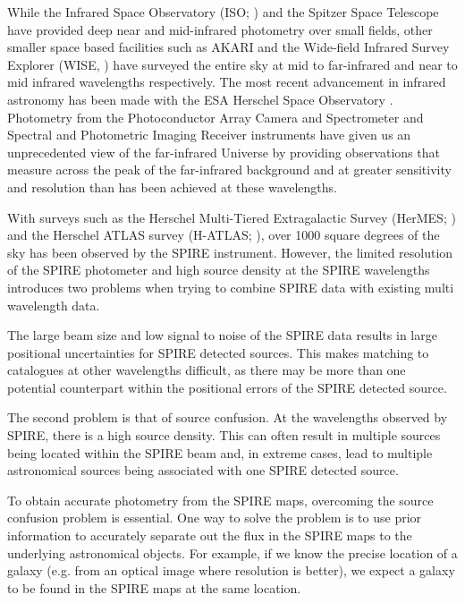 \documentclass[useAMS,usenatbib]{mnras}
\begin{document}
While the Infrared Space Observatory (ISO; \cite{Kessler:1996}) and the Spitzer Space Telescope \citep{Werner:2004} have provided deep near and mid-infrared photometry over small fields, other smaller space based facilities such as AKARI \citep{Murakami:2007} and the Wide-field Infrared Survey Explorer (WISE, \cite{Wright:2010}) have surveyed the entire sky at mid to far-infrared and near to mid infrared wavelengths respectively. The most recent advancement in infrared astronomy has been made with the ESA Herschel Space Observatory \citep{Pilbratt:2010}. Photometry from the Photoconductor Array Camera and Spectrometer \citep[PACS][]{Poglitsch:2010} and Spectral and Photometric Imaging Receiver \citep[SPIRE][]{Griffin:2010} instruments have given us an unprecedented view of the far-infrared Universe by providing observations that measure across the peak of the far-infrared background and at greater sensitivity and resolution than has been achieved at these wavelengths.

With surveys such as the Herschel Multi-Tiered Extragalactic Survey (HerMES; \cite{Oliver:2012}) and the Herschel ATLAS survey (H-ATLAS; \cite{Eales:2010}), over 1000 square degrees of the sky has been observed by the SPIRE instrument. However, the limited resolution of the SPIRE photometer and high source density at the SPIRE wavelengths introduces two problems when trying to combine SPIRE data with existing multi wavelength data. 

The large beam size and low signal to noise of the SPIRE data results in large positional uncertainties for SPIRE detected sources. This makes matching to catalogues at other wavelengths difficult, as there may be more than one potential counterpart within the positional errors of the SPIRE detected source.

The second problem is that of source confusion. At the wavelengths observed by SPIRE, there is a high source density. This can often result in multiple sources being located within the SPIRE beam and, in extreme cases, lead to multiple astronomical sources being associated with one SPIRE detected source. 

To obtain accurate photometry from the SPIRE maps, overcoming the source confusion problem is essential. One way to solve the problem is to use prior information to accurately separate out the flux in the SPIRE maps to the underlying astronomical objects. For example, if we know the precise location of a galaxy (e.g. from an optical image where resolution is better), we expect a galaxy to be found in the SPIRE maps at the same location.
\end{document}
